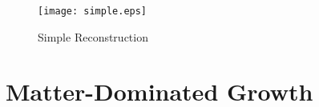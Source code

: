 \documentclass[12pt,preprint]{aastex}			%
\begin{document}
\begin{figure}
 \centering
 \texttt{[image: simple.eps]}
 \caption{Simple Reconstruction}
 \label{simple-reconstruction}
\end{figure}

 














\newpage
\appendix
\section{Matter-Dominated Growth}
\label{matter_dominated_growth}
\end{document}
